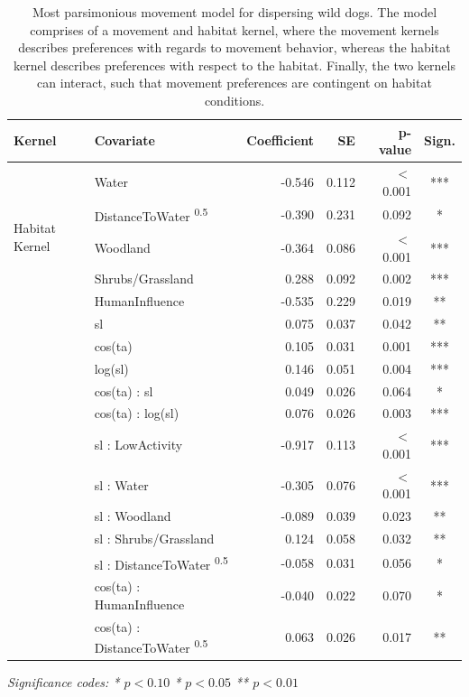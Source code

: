 \documentclass[abstract=on,10pt,a4paper,bibliography=totocnumbered]{article}
\begin{document}
\begin{table}
  \begin{center}
  \caption{Most parsimonious movement model for dispersing wild dogs. The model
  comprises of a movement and habitat kernel, where the movement kernels
  describes preferences with regards to movement behavior, whereas the habitat
  kernel describes preferences with respect to the habitat. Finally, the two
  kernels can interact, such that movement preferences are contingent on habitat
  conditions.}
  \label{MovementModelNumbers}
  \resizebox{\textwidth}{!} {
    \begin{threeparttable}
      \begin{tabular}{llrrrc}
        \toprule
        Kernel & Covariate & Coefficient & SE & p-value & Sign. \\
        \midrule
        \multirow{5}{*}{Habitat Kernel}
         & Water & -0.546 & 0.112 & \(<\) 0.001 & *** \\
         & DistanceToWater \textsuperscript{0.5} & -0.390 & 0.231 & 0.092 & * \\
         & Woodland & -0.364 & 0.086 & \(<\) 0.001 & *** \\
         & Shrubs/Grassland & 0.288 & 0.092 & 0.002 & *** \\
         & HumanInfluence & -0.535 & 0.229 & 0.019 & ** \\
        \hdashline
        \multirow{6}{*}{Movement Kernel}
         & sl & 0.075 & 0.037 & 0.042 & ** \\
         & cos(ta) & 0.105 & 0.031 & 0.001 & *** \\
         & log(sl) & 0.146 & 0.051 & 0.004 & *** \\
         & cos(ta) : sl & 0.049 & 0.026 & 0.064 & * \\
         & cos(ta) : log(sl) & 0.076 & 0.026 & 0.003 & *** \\
         & sl : LowActivity & -0.917 & 0.113 & \(<\) 0.001 & *** \\
        \hdashline
        \multirow{5}{*}{Interaction}
         & sl : Water & -0.305 & 0.076 & \(<\) 0.001 & *** \\
         & sl : Woodland & -0.089 & 0.039 & 0.023 & ** \\
         & sl : Shrubs/Grassland & 0.124 & 0.058 & 0.032 & ** \\
         & sl : DistanceToWater \textsuperscript{0.5} & -0.058 & 0.031 & 0.056 & * \\
         & cos(ta) : HumanInfluence & -0.040 & 0.022 & 0.070 & * \\
         & cos(ta) : DistanceToWater \textsuperscript{0.5} & 0.063 & 0.026 & 0.017 & ** \\
         \bottomrule
      \end{tabular}
       \begin{tablenotes}
         \item \textit{Significance codes: * \(p < 0.10\) \quad ** \(p < 0.05\)
         \quad *** \(p < 0.01\)}
       \end{tablenotes}
    \end{threeparttable}
    }
  \end{center}
\end{table}
\end{document}
